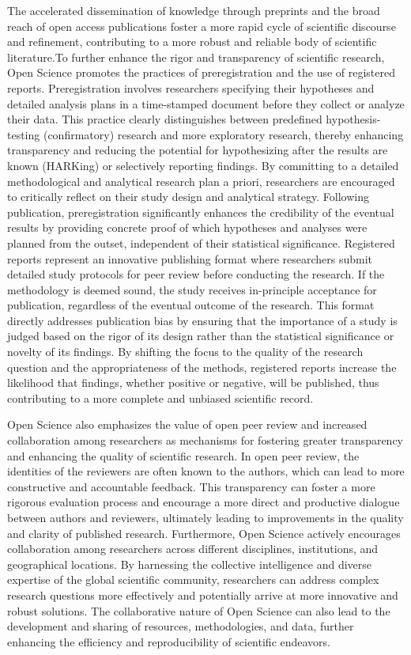 \documentclass{article}
\begin{document}
The accelerated dissemination of knowledge through preprints and the broad reach of open access publications foster a more rapid cycle of scientific discourse and refinement, contributing to a more robust and reliable body of scientific literature.To further enhance the rigor and transparency of scientific research, Open Science promotes the practices of preregistration and the use of registered reports. Preregistration involves researchers specifying their hypotheses and detailed analysis plans in a time-stamped document before they collect or analyze their data. This practice clearly distinguishes between predefined hypothesis-testing (confirmatory) research and more exploratory research, thereby enhancing transparency and reducing the potential for hypothesizing after the results are known (HARKing) or selectively reporting findings. By committing to a detailed methodological and analytical research plan a priori, researchers are encouraged to critically reflect on their study design and analytical strategy. Following publication, preregistration significantly enhances the credibility of the eventual results by providing concrete proof of which hypotheses and analyses were planned from the outset, independent of their statistical significance. Registered reports represent an innovative publishing format where researchers submit detailed study protocols for peer review before conducting the research. If the methodology is deemed sound, the study receives in-principle acceptance for publication, regardless of the eventual outcome of the research. This format directly addresses publication bias by ensuring that the importance of a study is judged based on the rigor of its design rather than the statistical significance or novelty of its findings. By shifting the focus to the quality of the research question and the appropriateness of the methods, registered reports increase the likelihood that findings, whether positive or negative, will be published, thus contributing to a more complete and unbiased scientific record.

Open Science also emphasizes the value of open peer review and increased collaboration among researchers as mechanisms for fostering greater transparency and enhancing the quality of scientific research. In open peer review, the identities of the reviewers are often known to the authors, which can lead to more constructive and accountable feedback. This transparency can foster a more rigorous evaluation process and encourage a more direct and productive dialogue between authors and reviewers, ultimately leading to improvements in the quality and clarity of published research. Furthermore, Open Science actively encourages collaboration among researchers across different disciplines, institutions, and geographical locations. By harnessing the collective intelligence and diverse expertise of the global scientific community, researchers can address complex research questions more effectively and potentially arrive at more innovative and robust solutions. The collaborative nature of Open Science can also lead to the development and sharing of resources, methodologies, and data, further enhancing the efficiency and reproducibility of scientific endeavors.
\end{document}
